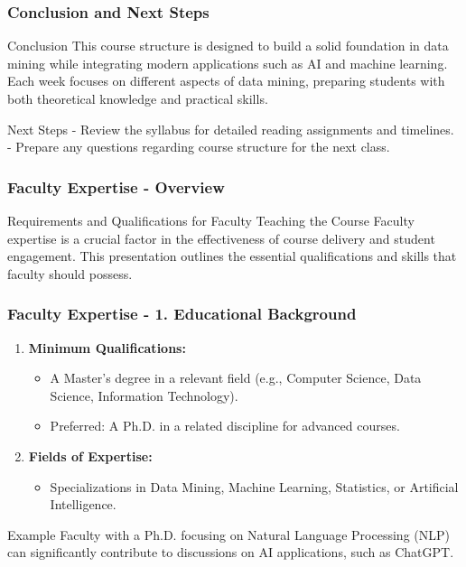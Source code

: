 \documentclass[aspectratio=169]{beamer}
\begin{document}
\begin{frame}[fragile]
    \frametitle{Conclusion and Next Steps}
    \begin{block}{Conclusion}
        This course structure is designed to build a solid foundation in data mining while integrating modern applications such as AI and machine learning. Each week focuses on different aspects of data mining, preparing students with both theoretical knowledge and practical skills.
    \end{block}
    
    \begin{block}{Next Steps}
        - Review the syllabus for detailed reading assignments and timelines. \\
        - Prepare any questions regarding course structure for the next class. 
    \end{block}
\end{frame}

\begin{frame}[fragile]
    \frametitle{Faculty Expertise - Overview}
    \begin{block}{Requirements and Qualifications for Faculty Teaching the Course}
        Faculty expertise is a crucial factor in the effectiveness of course delivery and student engagement. This presentation outlines the essential qualifications and skills that faculty should possess.
    \end{block}
\end{frame}

\begin{frame}[fragile]
    \frametitle{Faculty Expertise - 1. Educational Background}
    \begin{enumerate}
        \item \textbf{Minimum Qualifications:}
          \begin{itemize}
              \item A Master's degree in a relevant field (e.g., Computer Science, Data Science, Information Technology).
              \item Preferred: A Ph.D. in a related discipline for advanced courses.
          \end{itemize}
        \item \textbf{Fields of Expertise:}
          \begin{itemize}
              \item Specializations in Data Mining, Machine Learning, Statistics, or Artificial Intelligence.
          \end{itemize}
    \end{enumerate}
    \begin{block}{Example}
        Faculty with a Ph.D. focusing on Natural Language Processing (NLP) can significantly contribute to discussions on AI applications, such as ChatGPT.
    \end{block}
\end{frame}
\end{document}

